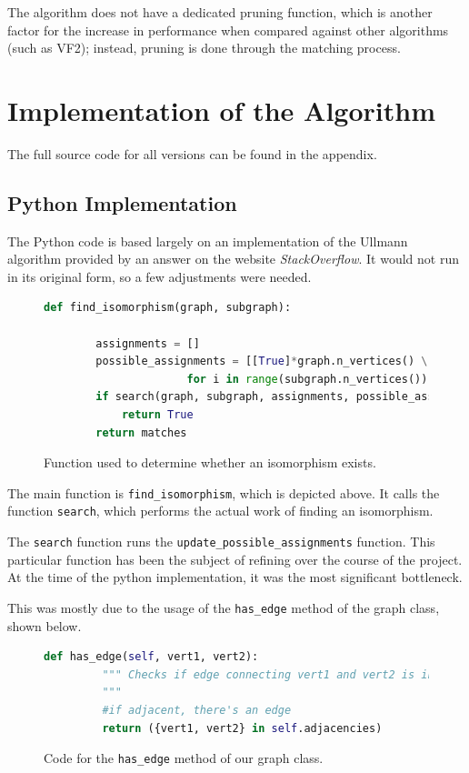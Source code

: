 \documentclass{article}
\begin{document}
  The algorithm does not have a dedicated pruning function, which is another factor for the increase in performance when compared against other algorithms (such as VF2); instead, pruning is done through the matching process.\cite{bonnici}

\section{Implementation of the Algorithm}

The full source code for all versions can be found in the appendix.

  \subsection{Python Implementation}
  The Python code is based largely on an implementation of the Ullmann algorithm provided by an answer on the website \textit{StackOverflow}.\cite{pyiso} It would not run in its original form, so a few adjustments were needed.

  \setcounter{figure}{0}
  \begin{figure}[H]
    \centering
    \begin{lstlisting}[language=Python]
    def find_isomorphism(graph, subgraph):

        assignments = []
        possible_assignments = [[True]*graph.n_vertices() \
                      for i in range(subgraph.n_vertices())]
        if search(graph, subgraph, assignments, possible_assignments):
            return True
        return matches
    \end{lstlisting}
    \caption{Function used to determine whether an isomorphism exists.}
    \label{ls:findisopy}
  \end{figure}

  The main function is \texttt{find\_isomorphism}, which is depicted above. It calls the function \texttt{search}, which performs the actual work of finding an isomorphism.

  The \texttt{search} function runs  the \texttt{update\_possible\_assignments} function. This particular function has been the subject of refining over the course of the project. At the time of the python implementation, it was the most significant bottleneck.

  This was mostly due to the usage of the \texttt{has\_edge} method of the graph class, shown below.

  \begin{figure}[H]
    \centering
    \begin{lstlisting}[language=Python]
    def has_edge(self, vert1, vert2):
         """ Checks if edge connecting vert1 and vert2 is in the graph
         """
         #if adjacent, there's an edge
         return ({vert1, vert2} in self.adjacencies)

    \end{lstlisting}
    \caption{Code for the \texttt{has\_edge} method of our graph class.}
    \label{ls:hasedgepy}
  \end{figure}
\end{document}
